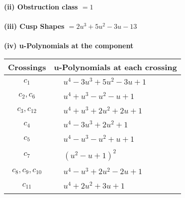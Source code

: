 \documentclass[1p]{elsarticle_modified}
\theoremstyle{definition}
\begin{document}
\flushleft \textbf{(ii) Obstruction class $= 1$}\\~\\
\flushleft \textbf{(iii) Cusp Shapes $= 2 u^3+5 u^2-3 u-13$}\\~\\
\newpage\renewcommand{\arraystretch}{1}
\flushleft \textbf{(iv) u-Polynomials at the component}\newline \\
\begin{tabular}{m{50pt}|m{274pt}}
Crossings & \hspace{64pt}u-Polynomials at each crossing \\
\hline $$\begin{aligned}c_{1}\end{aligned}$$&$\begin{aligned}
&u^4-3 u^3+5 u^2-3 u+1
\end{aligned}$\\
\hline $$\begin{aligned}c_{2},c_{6}\end{aligned}$$&$\begin{aligned}
&u^4+u^3- u^2- u+1
\end{aligned}$\\
\hline $$\begin{aligned}c_{3},c_{12}\end{aligned}$$&$\begin{aligned}
&u^4+u^3+2 u^2+2 u+1
\end{aligned}$\\
\hline $$\begin{aligned}c_{4}\end{aligned}$$&$\begin{aligned}
&u^4-3 u^3+2 u^2+1
\end{aligned}$\\
\hline $$\begin{aligned}c_{5}\end{aligned}$$&$\begin{aligned}
&u^4- u^3- u^2+u+1
\end{aligned}$\\
\hline $$\begin{aligned}c_{7}\end{aligned}$$&$\begin{aligned}
&(u^2- u+1)^2
\end{aligned}$\\
\hline $$\begin{aligned}c_{8},c_{9},c_{10}\end{aligned}$$&$\begin{aligned}
&u^4- u^3+2 u^2-2 u+1
\end{aligned}$\\
\hline $$\begin{aligned}c_{11}\end{aligned}$$&$\begin{aligned}
&u^4+2 u^2+3 u+1
\end{aligned}$\\
\hline
\end{tabular}\\~\\
\end{document}
